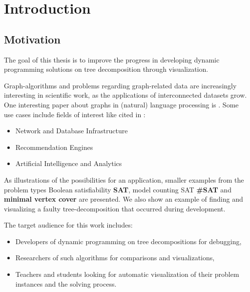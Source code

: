 \documentclass[a4paper, 12pt, bibliography=totoc]{scrartcl}
\begin{document}
{%
	\newpage
	
\tableofcontents
}

\newpage

\section{Introduction}
\subsection{Motivation}

The goal of this thesis is to improve the progress in developing dynamic programming solutions on tree decomposition through visualization.

Graph-algorithms and problems regarding graph-related data are increasingly interesting in scientific work, as the applications of interconnected datasets grow. One interesting paper about graphs in (natural) language processing is \cite{jones-etal-2013-modeling}.
Some use cases include fields of interest like cited in \cite{graphUseCases}: %
\begin{itemize}
	\item Network and Database Infrastructure
	\item Recommendation Engines
	\item Artificial Intelligence and Analytics
\end{itemize}

As illustrations of the possibilities for an application, smaller examples from the problem types Boolean satisfiability \textbf{SAT}, model counting SAT \textbf{\#SAT} and \textbf{minimal vertex cover} are presented.
We also show an example of finding  and visualizing a faulty tree-decomposition that occurred during development.


The target audience for this work includes: 
\begin{itemize}
	\item Developers of dynamic programming on tree decompositions for debugging,
	\item Researchers of such algorithms for comparisons and visualizations,
	\item Teachers and students looking for automatic visualization of their problem instances and the solving process.
\end{itemize} 
\end{document}
